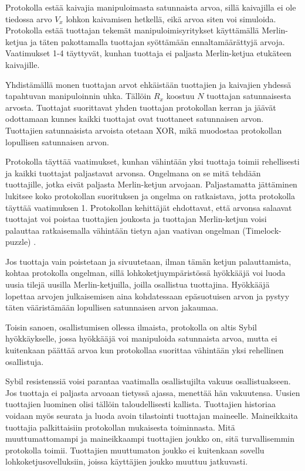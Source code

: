 Protokolla estää kaivajia manipuloimasta satunnaista arvoa, sillä kaivajilla ei ole tiedossa arvo $V_x$ lohkon kaivamisen hetkellä, eikä arvoa siten voi simuloida. Protokolla estää tuottajan tekemät manipuloimisyritykset käyttämällä Merlin-ketjua ja täten pakottamalla tuottajan syöttämään ennaltamäärättyjä arvoja. Vaatimukset 1-4 täyttyvät, kunhan tuottaja ei paljasta Merlin-ketjua etukäteen kaivajille. 

Yhdistämällä monen tuottajan arvot ehkäistään tuottajien ja kaivajien yhdessä tapahtuvan manipuloinnin uhka. Tällöin $R_x$ koostuu $N$ tuottajan satunnaisesta arvosta. Tuottajat suorittavat yhden tuottajan protokollan kerran ja jäävät odottamaan kunnes kaikki tuottajat ovat tuottaneet satunnaisen arvon. Tuottajien satunnaisista arvoista otetaan XOR, mikä muodostaa protokollan lopullisen satunnaisen arvon.

Protokolla täyttää vaatimukset, kunhan vähintään yksi tuottaja toimii rehellisesti ja kaikki tuottajat paljastavat arvonsa. Ongelmana on se mitä tehdään tuottajille, jotka eivät paljasta Merlin-ketjun arvojaan. Paljastamatta jättäminen lukitsee koko protokollan suorituksen ja ongelma on ratkaistava, jotta protokolla täyttää vaatimuksen 1. Protokollan kehittäjät ehdottavat, että arvonsa salaavat tuottajat voi poistaa tuottajien joukosta ja tuottajan Merlin-ketjun voisi palauttaa ratkaisemalla vähintään tietyn ajan vaativan ongelman (Timelock-puzzle) \cite{MerlinChains}.

Jos tuottaja vain poistetaan ja sivuutetaan, ilman tämän ketjun palauttamista, kohtaa protokolla ongelman, sillä lohkoketjuympäristössä hyökkääjä voi luoda uusia tilejä uusilla Merlin-ketjuilla, joilla osallistua tuottajina. Hyökkääjä lopettaa arvojen julkaisemisen aina kohdatessaan epäsuotuisen arvon ja pystyy täten vääristämään lopullisen satunnaisen arvon jakaumaa. 

Toisin sanoen, osallistumisen ollessa ilmaista, protokolla on altis Sybil hyökkäykselle, jossa hyökkääjä voi manipuloida satunnaista arvoa, mutta ei kuitenkaan päättää arvoa kun protokollaa suorittaa vähintään yksi rehellinen osallistuja.

Sybil resistenssiä voisi parantaa vaatimalla osallistujilta vakuus osallistuakseen. Jos tuottaja ei paljasta arvoaan tietyssä ajassa, menettää hän vakuutensa. Uusien tuottajien luominen olisi tällöin taloudellisesti kallista. Tuottajien historiaa voidaan myös seurata ja luoda avoin tilastointi tuottajan maineelle. Maineikkaita tuottajia palkittaisiin protokollan mukaisesta toiminnasta. Mitä muuttumattomampi ja maineikkaampi tuottajien joukko on, sitä turvallisemmin protokolla toimii. Tuottajien muuttumaton joukko ei kuitenkaan sovellu lohkoketjusovelluksiin, joissa käyttäjien joukko muuttuu jatkuvasti. 

